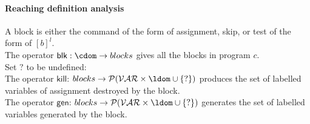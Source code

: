  \paragraph{Reaching definition analysis}
A block  is either the command of the form of assignment, skip, or test of the form of $[b]^{l}$.\\
The operator $\mathsf{blk} : \cdom \to blocks$ gives all the blocks in program $c$.
\\
 Set $?$ to be undefined:
 \\
The operator $\mathsf{kill}$: $blocks \to \mathcal{P}(\mathcal{VAR} \times \ldom \cup \{?\})$ produces the set of labelled variables of assignment destroyed by the block.
 \\
  The operator $\mathsf{gen}$: $blocks \to \mathcal{P}(\mathcal{VAR} \times \ldom \cup \{?\})$ generates the set of labelled variables generated by the block.
  \\
